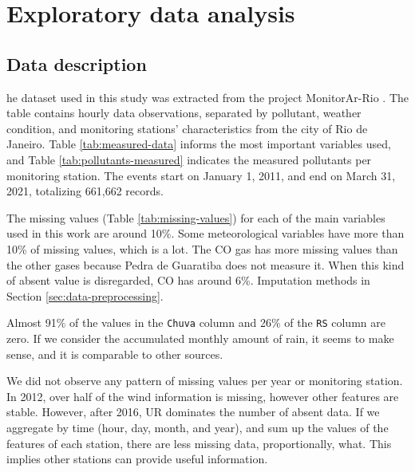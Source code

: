\section{Exploratory data analysis}
\label{sec:eda}

\subsection{Data description}

he dataset used in this study was extracted from the project MonitorAr-Rio
\cite{dataset-rio-ar-quality}. The table contains hourly data observations, separated by
pollutant, weather condition, and monitoring stations' characteristics from
the city of Rio de Janeiro. Table
\ref{tab:measured-data} informs the most important variables used, and Table
\ref{tab:pollutants-measured} indicates the measured pollutants per monitoring
station. The events start on January 1,
2011,
and end on March 31, 2021, totalizing 661,662 records.

The missing values (Table \ref{tab:missing-values}) for each of the main variables used in this work 
are around 10\%. Some meteorological variables have more than 10\% of missing values, which is a lot.
The CO gas has more missing values than the other gases because Pedra de
Guaratiba does not measure it. When this kind of absent value is disregarded,
CO has around 6\%. Imputation methods in Section \ref{sec:data-preprocessing}.

Almost 91\% of the values in the {\tt Chuva} column and 26\% of the {\tt RS} column are zero. If we consider the accumulated monthly amount of
rain, it seems to make sense, and it is comparable to other sources. 

We did not observe any pattern of missing values per year or monitoring
station. In 2012, over half of the wind information is missing, however other
features are stable. However, after 2016, UR dominates the number of absent
data. If we aggregate by time (hour, day, month, and year), and sum up the
values of the features of each station, there are less missing data,
proportionally, what. This
implies other stations can provide useful information. 

